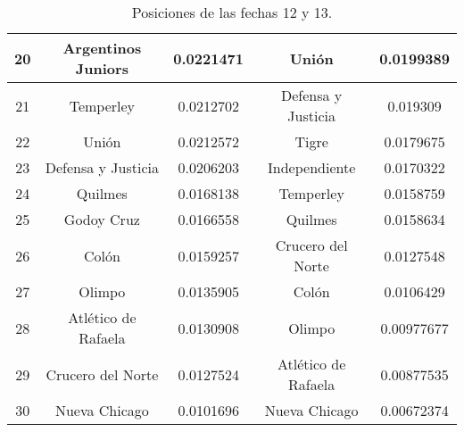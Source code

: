 \begin{table}
\begin{flushright}
\begin{tabular}{| c | c | c || c | c |}
		20 & Argentinos Juniors & 0.0221471 & Unión & 0.0199389 \\ \hline
		21 & Temperley & 0.0212702 & Defensa y Justicia & 0.019309 \\ \hline
		22 & Unión & 0.0212572 & Tigre & 0.0179675 \\ \hline
		23 & Defensa y Justicia & 0.0206203 & Independiente & 0.0170322 \\ \hline
		24 & Quilmes & 0.0168138 & Temperley & 0.0158759 \\ \hline
		25 & Godoy Cruz & 0.0166558 & Quilmes & 0.0158634 \\ \hline
		26 & Colón & 0.0159257 & Crucero del Norte & 0.0127548 \\ \hline
		27 & Olimpo & 0.0135905 & Colón & 0.0106429 \\ \hline
		28 & Atlético de Rafaela & 0.0130908 & Olimpo & 0.00977677 \\ \hline
		29 & Crucero del Norte & 0.0127524 & Atlético de Rafaela & 0.00877535 \\ \hline
		30 & Nueva Chicago & 0.0101696 & Nueva Chicago & 0.00672374 \\ \hline
	\end{tabular}
	\end{flushright}
	\caption{\footnotesize Posiciones de las fechas 12 y 13.}
\end{table}